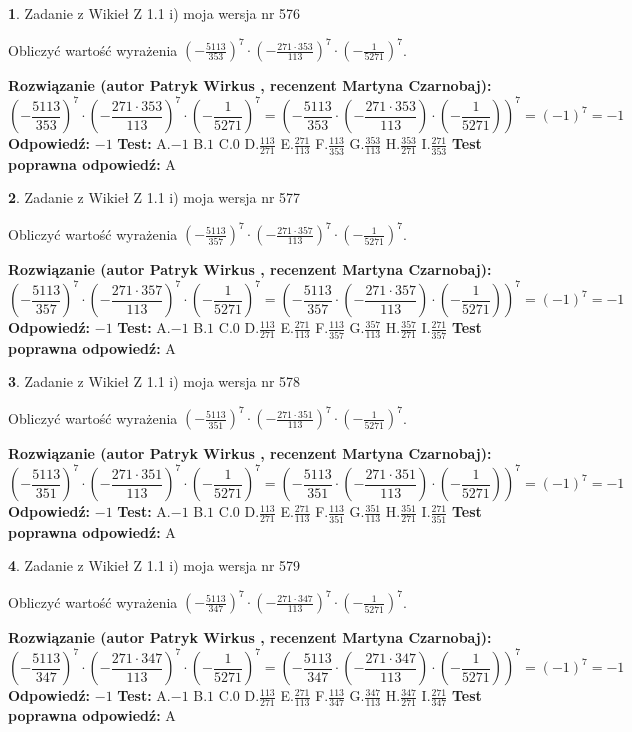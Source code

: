 \documentclass[12pt, a4paper]{article}
\theoremstyle{definition} %
\newtheorem{zad}{}
\newcommand{\zadStart}[1]{\begin{zad}#1\newline}
\newcommand{\zadStop}{\end{zad}}
\newcommand{\rozwStart}[2]{\noindent \textbf{Rozwiązanie (autor #1 , recenzent #2): }\newline}
\newcommand{\rozwStop}{\newline}
\newcommand{\odpStart}{\noindent \textbf{Odpowiedź:}\newline}
\newcommand{\odpStop}{\newline}
\newcommand{\testStart}{\noindent \textbf{Test:}\newline}
\newcommand{\testStop}{\newline}
\newcommand{\kluczStart}{\noindent \textbf{Test poprawna odpowiedź:}\newline}
\newcommand{\kluczStop}{\newline}
\begin{document}
\zadStart{Zadanie z Wikieł Z 1.1 i) moja wersja nr 576}

Obliczyć wartość wyrażenia $(-\frac{5113}{353})^{7} \cdot (-\frac{271 \cdot 353}{113})^{7} \cdot (-\frac{1}{5271})^{7}$.
\zadStop
\rozwStart{Patryk Wirkus}{Martyna Czarnobaj}
$$(-\frac{5113}{353})^{7} \cdot (-\frac{271 \cdot 353}{113})^{7} \cdot (-\frac{1}{5271})^{7} = (-\frac{5113}{353} \cdot (-\frac{271 \cdot 353}{113}) \cdot (-\frac{1}{5271}))^{7} = (-1)^{7} = -1$$
\rozwStop
\odpStart
$-1$
\odpStop
\testStart
A.$-1$ B.$1$ C.$0$ D.$\frac{113}{271}$ E.$\frac{271}{113}$
F.$\frac{113}{353}$ G.$\frac{353}{113}$
H.$\frac{353}{271}$
I.$\frac{271}{353}$
\testStop
\kluczStart
A
\kluczStop



\zadStart{Zadanie z Wikieł Z 1.1 i) moja wersja nr 577}

Obliczyć wartość wyrażenia $(-\frac{5113}{357})^{7} \cdot (-\frac{271 \cdot 357}{113})^{7} \cdot (-\frac{1}{5271})^{7}$.
\zadStop
\rozwStart{Patryk Wirkus}{Martyna Czarnobaj}
$$(-\frac{5113}{357})^{7} \cdot (-\frac{271 \cdot 357}{113})^{7} \cdot (-\frac{1}{5271})^{7} = (-\frac{5113}{357} \cdot (-\frac{271 \cdot 357}{113}) \cdot (-\frac{1}{5271}))^{7} = (-1)^{7} = -1$$
\rozwStop
\odpStart
$-1$
\odpStop
\testStart
A.$-1$ B.$1$ C.$0$ D.$\frac{113}{271}$ E.$\frac{271}{113}$
F.$\frac{113}{357}$ G.$\frac{357}{113}$
H.$\frac{357}{271}$
I.$\frac{271}{357}$
\testStop
\kluczStart
A
\kluczStop



\zadStart{Zadanie z Wikieł Z 1.1 i) moja wersja nr 578}

Obliczyć wartość wyrażenia $(-\frac{5113}{351})^{7} \cdot (-\frac{271 \cdot 351}{113})^{7} \cdot (-\frac{1}{5271})^{7}$.
\zadStop
\rozwStart{Patryk Wirkus}{Martyna Czarnobaj}
$$(-\frac{5113}{351})^{7} \cdot (-\frac{271 \cdot 351}{113})^{7} \cdot (-\frac{1}{5271})^{7} = (-\frac{5113}{351} \cdot (-\frac{271 \cdot 351}{113}) \cdot (-\frac{1}{5271}))^{7} = (-1)^{7} = -1$$
\rozwStop
\odpStart
$-1$
\odpStop
\testStart
A.$-1$ B.$1$ C.$0$ D.$\frac{113}{271}$ E.$\frac{271}{113}$
F.$\frac{113}{351}$ G.$\frac{351}{113}$
H.$\frac{351}{271}$
I.$\frac{271}{351}$
\testStop
\kluczStart
A
\kluczStop



\zadStart{Zadanie z Wikieł Z 1.1 i) moja wersja nr 579}

Obliczyć wartość wyrażenia $(-\frac{5113}{347})^{7} \cdot (-\frac{271 \cdot 347}{113})^{7} \cdot (-\frac{1}{5271})^{7}$.
\zadStop
\rozwStart{Patryk Wirkus}{Martyna Czarnobaj}
$$(-\frac{5113}{347})^{7} \cdot (-\frac{271 \cdot 347}{113})^{7} \cdot (-\frac{1}{5271})^{7} = (-\frac{5113}{347} \cdot (-\frac{271 \cdot 347}{113}) \cdot (-\frac{1}{5271}))^{7} = (-1)^{7} = -1$$
\rozwStop
\odpStart
$-1$
\odpStop
\testStart
A.$-1$ B.$1$ C.$0$ D.$\frac{113}{271}$ E.$\frac{271}{113}$
F.$\frac{113}{347}$ G.$\frac{347}{113}$
H.$\frac{347}{271}$
I.$\frac{271}{347}$
\testStop
\kluczStart
A
\kluczStop
\end{document}
